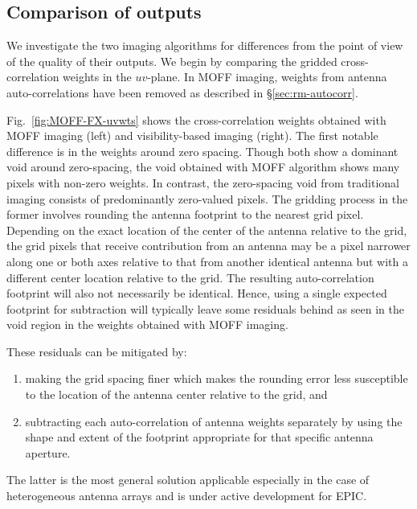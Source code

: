 \documentclass[a4paper,fleqn,usenatbib]{../mnras}
\begin{document}
\subsection{Comparison of outputs}\label{sec:diff}

We investigate the two imaging algorithms for differences from the point of 
view of the quality of their outputs. We begin by comparing the gridded 
cross-correlation weights in the $uv$-plane. In MOFF imaging, weights 
from antenna auto-correlations have been removed as described in 
\S\ref{sec:rm-autocorr}. 

Fig.~\ref{fig:MOFF-FX-uvwts} shows the cross-correlation weights obtained 
with MOFF imaging (left) and visibility-based imaging (right). The first 
notable difference is in the weights around zero spacing. Though both show a
dominant void around zero-spacing, the void obtained with MOFF algorithm shows 
many pixels with non-zero weights. In contrast, the zero-spacing void from 
traditional imaging consists of predominantly zero-valued pixels. The gridding
process in the former involves rounding the antenna footprint to the nearest 
grid pixel. Depending on the exact location of the center of the antenna 
relative to the grid, the grid pixels that receive contribution from an
antenna may be a pixel narrower along one or both axes relative to that from
another identical antenna but with a different center location relative to the
grid. The resulting auto-correlation footprint will also not necessarily be 
identical. Hence, using a single expected footprint for subtraction will
typically leave some residuals behind as seen in the void region in the 
weights obtained with MOFF imaging. 

These residuals can be mitigated by: 
\begin{enumerate}
  \item making the grid spacing finer which makes the rounding error less 
    susceptible to the location of the antenna center relative to the grid, 
    and
  \item subtracting each auto-correlation of antenna weights separately by 
    using the shape and extent of the footprint appropriate for that specific
    antenna aperture. 
\end{enumerate}
The latter is the most general solution applicable especially in the case of 
heterogeneous antenna arrays and is under active development for EPIC.
\end{document}
